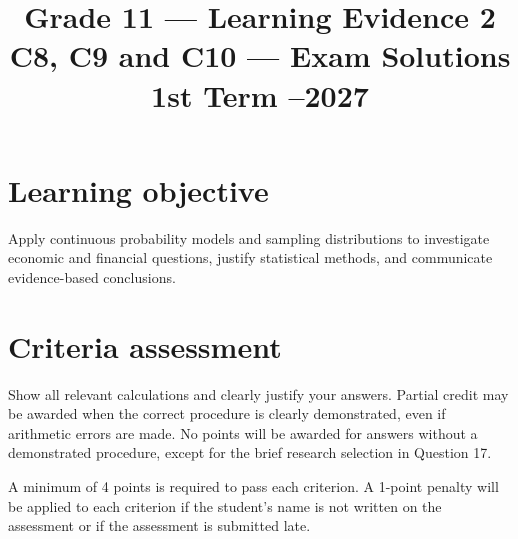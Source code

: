 \makeatletter
{}
\makeatother

\graphicspath{{./}{../}{../../}{../../../}{../../../../}{preamble/}{../preamble/}{../../preamble/}{../../../preamble/}{../../../../preamble/}}
\linespread{1.0}
\setlength{\parskip}{5pt}
\usepackage{needspace}
\title{Grade 11 --- Learning Evidence 2\\C8, C9 and C10 --- Exam Solutions\\\large 1st Term --2027}
\author{}
\date{}

\maketitle
\setcounter{tocdepth}{1}
\setcounter{secnumdepth}{2}
\label{toc}
\tableofcontents

\section*{Learning objective}
Apply continuous probability models and sampling distributions to investigate economic and financial questions, justify statistical methods, and communicate evidence-based conclusions.

\section*{Criteria assessment}
Show all relevant calculations and clearly justify your answers. Partial credit may be awarded when the correct procedure is clearly demonstrated, even if arithmetic errors are made. No points will be awarded for answers without a demonstrated procedure, except for the brief research selection in Question 17.

A minimum of 4 points is required to pass each criterion. A 1-point penalty will be applied to each criterion if the student's name is not written on the assessment or if the assessment is submitted late.


